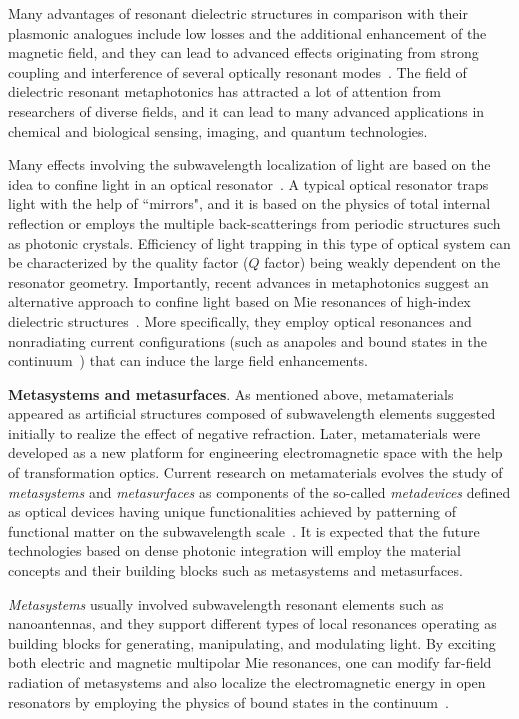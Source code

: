 \documentclass[journal=chreay,manuscript=review]{achemso}
\begin{document}
Many advantages of resonant dielectric structures in comparison with their plasmonic analogues include low losses and the additional enhancement of the magnetic field, and they can lead to advanced effects originating from strong coupling and interference of several optically resonant modes~\cite{Koshelev_2021}. The field of dielectric resonant metaphotonics has attracted a lot of attention from researchers of diverse fields, and it can lead to many advanced applications in chemical and biological sensing, imaging, and quantum technologies. 

Many effects involving the subwavelength localization of light are based on the idea to confine light in an optical resonator~\cite{vahala_2003}. A typical optical resonator traps light with the help of “mirrors", and it is based on the physics of total internal reflection or employs the multiple back-scatterings from periodic structures such as photonic crystals. Efficiency of light trapping in this type of optical system can be characterized by the quality factor ($Q$ factor) being weakly dependent on the resonator geometry. Importantly, recent advances in metaphotonics suggest an alternative approach to confine light based on Mie resonances of high-index dielectric structures~\cite{Koshelev_2021}. More specifically, they employ optical resonances and nonradiating current configurations (such as anapoles and bound states in the continuum~\cite{BIC_2019}) that can induce the large field enhancements.

{\bf Metasystems and metasurfaces}.  As mentioned above, metamaterials appeared as artificial structures composed of subwavelength elements suggested initially to realize the effect of negative refraction. 
Later, metamaterials were developed as a new platform for engineering electromagnetic space with the help of transformation optics. Current research on metamaterials evolves the study of {\it metasystems} and {\it metasurfaces} as components of the so-called {\it metadevices} defined as optical devices having unique functionalities achieved by patterning of functional matter on the subwavelength scale~\cite{metadevices}. It is expected that the future technologies based on dense photonic integration will employ the material concepts and their building blocks such as metasystems and metasurfaces. 

{\it Metasystems} usually involved subwavelength resonant elements such as nanoantennas, and they support different types of local resonances operating as building blocks for generating, manipulating, and modulating light. By exciting both electric and magnetic multipolar Mie resonances, one can modify far-field radiation of metasystems and also localize the electromagnetic energy in open resonators by employing the physics of bound states in the continuum~\cite{BIC_2019}.
\end{document}
